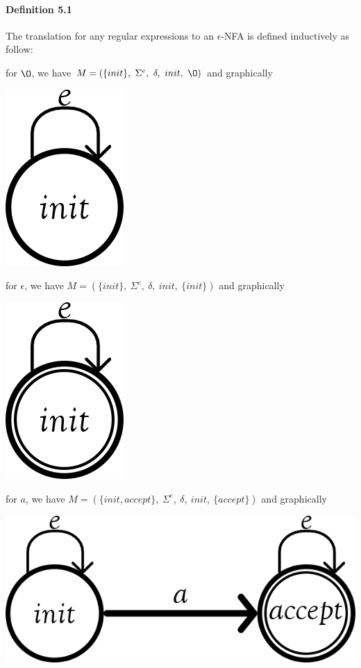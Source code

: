 \documentclass[twoside,openright,final]{bhamthesis}
\renewcommand{\item}{\itemindent0.5cm\itemold}
\begin{document}
\paragraph{Definition 5.1} The translation for any regular expressions
to an \(\epsilon\)-NFA is defined inductively as follow:
\begin{enumerate}[nolistsep]
  \item for \(\O\), we have \(M = (\{init\},\ \Sigma^e,\ \delta,\
    init,\ \O)\) and graphically \begin{center}\includegraphics{null}\end{center}
  \item for \(\epsilon\), we have \(M = (\{init\},\ \Sigma^e,\
    \delta,\ init,\ \{init\})\) and graphically \begin{center}\includegraphics{epsilon}\end{center}
  \item for \(a\), we have \(M = (\{init, accept\},\ \Sigma^e,\
    \delta,\ init,\ \{accept\})\) and graphically \begin{center}\includegraphics{singleton}\end{center}

\end{enumerate}
\end{document}
